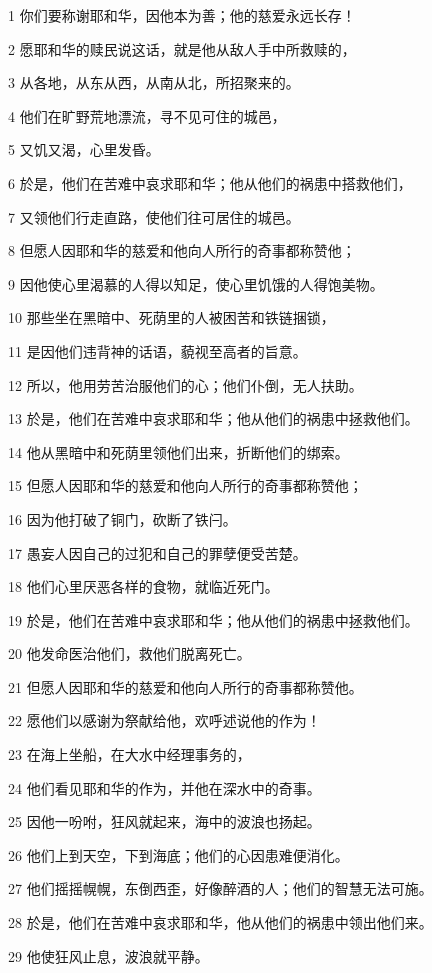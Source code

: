 \par 1 你们要称谢耶和华，因他本为善；他的慈爱永远长存！
\par 2 愿耶和华的赎民说这话，就是他从敌人手中所救赎的，
\par 3 从各地，从东从西，从南从北，所招聚来的。
\par 4 他们在旷野荒地漂流，寻不见可住的城邑，
\par 5 又饥又渴，心里发昏。
\par 6 於是，他们在苦难中哀求耶和华；他从他们的祸患中搭救他们，
\par 7 又领他们行走直路，使他们往可居住的城邑。
\par 8 但愿人因耶和华的慈爱和他向人所行的奇事都称赞他；
\par 9 因他使心里渴慕的人得以知足，使心里饥饿的人得饱美物。
\par 10 那些坐在黑暗中、死荫里的人被困苦和铁链捆锁，
\par 11 是因他们违背神的话语，藐视至高者的旨意。
\par 12 所以，他用劳苦治服他们的心；他们仆倒，无人扶助。
\par 13 於是，他们在苦难中哀求耶和华；他从他们的祸患中拯救他们。
\par 14 他从黑暗中和死荫里领他们出来，折断他们的绑索。
\par 15 但愿人因耶和华的慈爱和他向人所行的奇事都称赞他；
\par 16 因为他打破了铜门，砍断了铁闩。
\par 17 愚妄人因自己的过犯和自己的罪孽便受苦楚。
\par 18 他们心里厌恶各样的食物，就临近死门。
\par 19 於是，他们在苦难中哀求耶和华；他从他们的祸患中拯救他们。
\par 20 他发命医治他们，救他们脱离死亡。
\par 21 但愿人因耶和华的慈爱和他向人所行的奇事都称赞他。
\par 22 愿他们以感谢为祭献给他，欢呼述说他的作为！
\par 23 在海上坐船，在大水中经理事务的，
\par 24 他们看见耶和华的作为，并他在深水中的奇事。
\par 25 因他一吩咐，狂风就起来，海中的波浪也扬起。
\par 26 他们上到天空，下到海底；他们的心因患难便消化。
\par 27 他们摇摇幌幌，东倒西歪，好像醉酒的人；他们的智慧无法可施。
\par 28 於是，他们在苦难中哀求耶和华，他从他们的祸患中领出他们来。
\par 29 他使狂风止息，波浪就平静。
